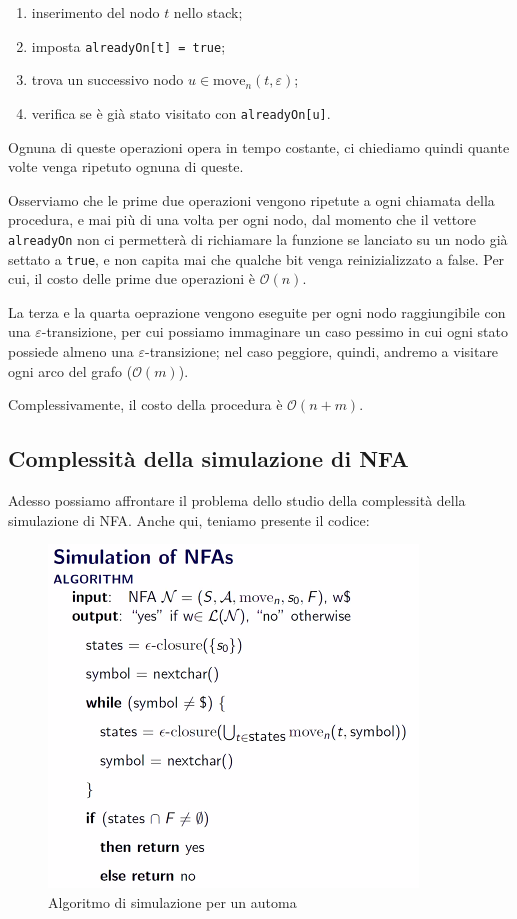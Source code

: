 \documentclass[class=book, crop=false, oneside, 12pt]{standalone}
\begin{document}
\begin{enumerate}
    \item inserimento del nodo \(t\) nello stack;
    \item imposta \texttt{alreadyOn[t] = true};
    \item trova un successivo nodo \(u \in \textrm{move}_n(t, \varepsilon)\);
    \item verifica se è già stato visitato con \texttt{alreadyOn[u]}.
\end{enumerate}

\noindent Ognuna di queste operazioni opera in tempo costante, ci chiediamo quindi quante volte venga ripetuto ognuna di queste.

Osserviamo che le prime due operazioni vengono ripetute a ogni chiamata della procedura, e mai più di una volta per ogni nodo, dal momento che il vettore \texttt{alreadyOn} non ci permetterà di richiamare la funzione se lanciato su un nodo già settato a \texttt{true}, e non capita mai che qualche bit venga reinizializzato a false. Per cui, il costo delle prime due operazioni è \(\mathcal{O}(n)\).

La terza e la quarta oeprazione vengono eseguite per ogni nodo raggiungibile con una \(\varepsilon\)-transizione, per cui possiamo immaginare un caso pessimo in cui ogni stato possiede almeno una \(\varepsilon\)-transizione; nel caso peggiore, quindi, andremo a visitare ogni arco del grafo (\(\mathcal{O}(m)\)).

Complessivamente, il costo della procedura è \(\mathcal{O}(n + m)\).

\subsection{Complessità della simulazione di NFA}
Adesso possiamo affrontare il problema dello studio della complessità della simulazione di NFA. Anche qui, teniamo presente il codice:

\begin{figure}
    \centering
    \includegraphics[width=.6\textwidth,keepaspectratio]{algoritmo_simulazione_nfa}
    \caption{Algoritmo di simulazione per un automa}
    \label{algoritmo_simulazione_nfa}
\end{figure}
\end{document}
